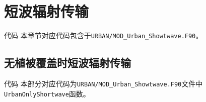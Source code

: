 \section{短波辐射传输}\label{短波辐射传输}
\begin{mymdframed}{代码}
本章节对应代码包含于\texttt{URBAN/MOD\_Urban\_Showtwave.F90}。
\end{mymdframed}

\subsection{无植被覆盖时短波辐射传输}\label{无植被覆盖时短波辐射传输}
\begin{mymdframed}{代码}
本部分对应代码为\texttt{URBAN/MOD\_Urban\_Showtwave.F90}文件中\texttt{UrbanOnlyShortwave}函数。
\end{mymdframed}

